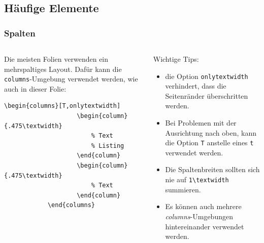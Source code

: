 \documentclass[german,notoc,draft]{tudbeamer}%
\begin{document}
\subsection{Häufige Elemente}
\begin{frame}[fragile]
	\frametitle{Spalten}

	\begin{columns}[T,onlytextwidth]
		\begin{column}{.475\textwidth}
			Die meisten Folien verwenden ein mehrspaltiges Layout. Dafür kann die \texttt{columns}-Umgebung verwendet werden, wie auch in dieser Folie:
			\begin{lstlisting}[gobble=8,style=latex,numbers=none]
				\begin{columns}[T,onlytextwidth]
					\begin{column}{.475\textwidth}
						% Text
						% Listing
					\end{column}
					\begin{column}{.475\textwidth}
						% Text
					\end{column}
			\end{columns}
			\end{lstlisting} 
		\end{column}
		\begin{column}{.475\textwidth}
			Wichtige Tips:
			\begin{itemize}
				\item die Option \texttt{onlytextwidth} verhindert, dass die Seitenränder überschritten werden.
				\item Bei Problemen mit der Ausrichtung nach oben, kann die Option \texttt{T} anstelle eines \texttt{t} verwendet werden.
				\item Die Spaltenbreiten sollten sich nie auf \texttt{1\textbackslash textwidth} summieren.
				\item Es können auch mehrere \emph{columns}-Umgebungen hintereinander verwendet werden.
			\end{itemize}
		\end{column}
	\end{columns}
\end{frame}
\end{document}
